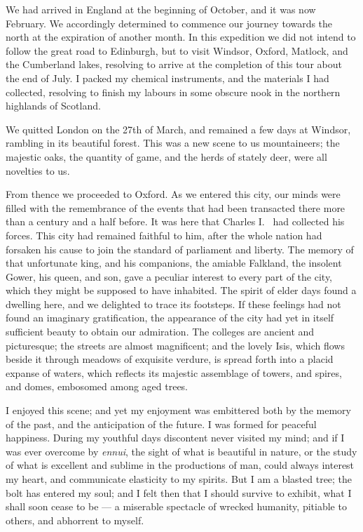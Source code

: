 We had arrived in England at the
beginning of October, and it was now
February. We accordingly determined
to commence our journey towards the
north at the expiration of another
month. In this expedition we did not
intend to follow the great road to Edinburgh,
but to visit Windsor, Oxford,
Matlock, and the Cumberland lakes,
resolving to arrive at the completion of
this tour about the end of July. I
packed my chemical instruments, and
the materials I had collected, resolving
to finish my labours in some obscure
nook in the northern highlands of Scotland.

We quitted London on the 27th of
March, and remained a few days at
Windsor, rambling in its beautiful forest.
This was a new scene to us mountaineers;
the majestic oaks, the quantity
of game, and the herds of stately
deer, were all novelties to us.

From thence we proceeded to Oxford.
As we entered this city, our minds
were filled with the remembrance of
the events that had been transacted
there more than a century and a half
before. It was here that Charles I.~%
had collected his forces. This city had
remained faithful to him, after the whole
nation had forsaken his cause to join
the standard of parliament and liberty.
The memory of that unfortunate king,
and his companions, the amiable Falkland,
the insolent Gower, his queen,
and son, gave a peculiar interest to
every part of the city, which they might
be supposed to have inhabited. The
spirit of elder days found a dwelling
here, and we delighted to trace its
footsteps. If these feelings had not
found an imaginary gratification, the
appearance of the city had yet in itself
sufficient beauty to obtain our admiration.
The colleges are ancient and
picturesque; the streets are almost magnificent;
and the lovely Isis, which
flows beside it through meadows of exquisite
verdure, is spread forth into a
placid expanse of waters, which reflects
its majestic assemblage of towers, and
spires, and domes, embosomed among
aged trees.

I enjoyed this scene; and yet my
enjoyment was embittered both by the
memory of the past, and the anticipation
of the future. I was formed for
peaceful happiness. During my youthful
days discontent never visited my
mind; and if I was ever overcome by
\emph{ennui}, the sight of what is beautiful in
nature, or the study of what is excellent
and sublime in the productions of man,
could always interest my heart, and
communicate elasticity to my spirits.
But I am a blasted tree; the bolt has
entered my soul; and I felt then that I
should survive to exhibit, what I shall
soon cease to be --- a miserable spectacle
of wrecked humanity, pitiable to others,
and abhorrent to myself.

